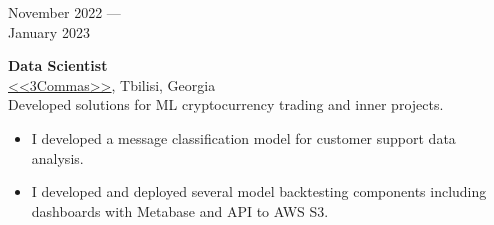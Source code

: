 \documentclass[10pt,a4paper]{article}
\newcommand{\lmpratio}{0.15}
\newcommand{\rmpratio}{0.74}
\newcommand{\vSpace}{0.5cm}
\newcommand{\horizontalSpace}{0.05\textwidth}
\newcommand{\sectionMain}[1]{\textbf{#1}}
\begin{document}
	\begin{minipage}[t]{\lmpratio\textwidth}
		November 2022 --- \\January 2023
	\end{minipage}
	\hspace{\horizontalSpace}
	\begin{minipage}[t]{\rmpratio\textwidth}
		\sectionMain{Data Scientist}\\
		\href{https://3commas.io/}{<<3Commas>>}, Tbilisi, Georgia\\[0.1cm]		

Developed solutions for ML cryptocurrency trading and inner projects.

		\begin{itemize}
                \item 
I developed a message classification model for customer support data analysis.

			\item 
I developed and deployed several model backtesting components including dashboards with Metabase and API to AWS S3.
		\end{itemize}
		
	\end{minipage}	
	\vspace{\vSpace}
\end{document}

